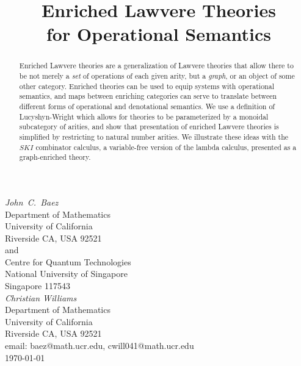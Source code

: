 \documentclass{amsart}
\theoremstyle{definition}
\begin{document}
\title{Enriched Lawvere Theories \\
for Operational Semantics}

\maketitle
\begin{center}   
  {\em John\ C.\ Baez \\}
  \vspace{0.3cm}
  {\small
 Department of Mathematics \\
    University of California \\
  Riverside CA, USA 92521 \\ and \\
 Centre for Quantum Technologies  \\
    National University of Singapore \\
    Singapore 117543  \\    } 
  \vspace{0.4cm}
{\em Christian Williams \\}
\vspace{0.3cm}
   {\small
   Department of Mathematics \\
  University of California \\
  Riverside CA, USA 92521 \\}
  \vspace{0.3cm}   
  {\small email:  baez@math.ucr.edu, cwill041@math.ucr.edu\\} 
  \vspace{0.3cm}   
  {\small \today}
  \vspace{0.3cm}   
\end{center} 

\begin{abstract} 
Enriched Lawvere theories are a generalization of Lawvere theories that allow there to be not merely a \emph{set} of operations of each given arity, but a \emph{graph}, or an object of some other category. Enriched theories can be used to equip systems with operational semantics, and maps between enriching categories can serve to translate between different forms of operational and denotational semantics. We use a definition of Lucyshyn-Wright which allows for theories to be parameterized by a monoidal subcategory of arities, and show that presentation of enriched Lawvere theories is simplified by restricting to natural number arities. We illustrate these ideas with the $SKI$ combinator calculus, a variable-free version of the lambda calculus, presented as a graph-enriched theory.  
\end{abstract}
\end{document}
